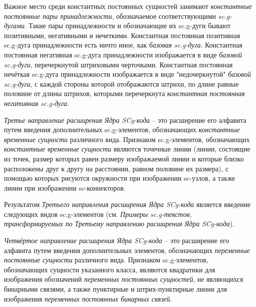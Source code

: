 Важное место среди константных постоянных сущностей занимают \textit{константные постоянные пары принадлежности}, обозначаемое соответствующими \textit{sc.g-дугами}. Такие пары принадлежности и обозначающие их sc.g-дуги бывают позитивными, негативными и нечеткими. Константная постоянная позитивная sc.g-дуга принадлежности есть ничто иное, как \textit{базовая sc.g-дуга}. Константная постоянная негативная sc.g-дуга принадлежности изображается в виде \textit{базовой sc.g-дуги}, перечеркнутой штриховыми черточками. Константная постоянная нечёткая sc.g-дуга принадлежности изображается в виде "недочеркнутой"{} \textit{базовой sc.g-дуги}, с каждой стороны которой отображаются штрихи, по длине равные половине от длины штрихов, которыми перечеркнута \textit{константная постоянная негативная sc.g-дуга}.

\begin{SCn}
\end{SCn}

\textit{Третье направление расширения Ядра SCg-кода} -- это расширение его алфавита путем введения дополнительных sc.g-элементов, обозначающих \textit{константные временные сущности} различного вида. Признаком sc.g-элементов, обозначающих \textit{константные временные сущности} являются точечные линии (линии, состоящие из точек, размер которых равен размеру изображаемой линии и которые близко расположены друг к другу на расстоянии, равном половине их размера), с помощью которых рисуются окружности при изображении sc-узлов, а также линии при изображении sc-коннекторов.

Результатом \textit{Третьего направления расширения Ядра SCg-кода} является введение следующих видов sc.g-элементов (см. \textit{Примеры sc.g-текстов, трансформируемых по Третьему направлению расширения Ядра SCg-кода}).

\begin{SCn}
\end{SCn}
	
\textit{Четвёртое направление расширения Ядра SCg-кода} -- это расширение его алфавита путем введения дополнительных элементов, обозначающих \textit{переменные постоянные сущности} различного вида. Признаком sc.g-элементов, обозначающих сущности указанного класса, являются квадратики для изображения обозначений \textit{переменных постоянных сущностей}, не являющихся бинарными связями, а также пунктирные и штрих-пунктирные линии для изображения \textit{переменных постоянных бинарных связей}. 

